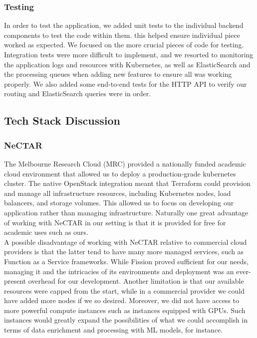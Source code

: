 \subsubsection{Testing}
In order to test the application, we added unit tests to the individual backend components to test the code within them. this helped ensure individual piece worked as expected. We focused on the more crucial pieces of code for testing. Integration tests were more difficult to implement, and we resorted to monitoring the application logs and resources with Kubernetes, as well as ElasticSearch and the processing queues when adding new features to ensure all was working properly. We also added some end-to-end tests for the HTTP API to verify our routing and ElasticSearch queries were in order.

\subsection{Tech Stack Discussion}

\subsubsection{NeCTAR}
The Melbourne Research Cloud (MRC) provided a nationally funded academic cloud environment that allowed us to deploy a production-grade kubernetes cluster. The native OpenStack integration meant that Terraform could provision and manage all infrastructure resources, including Kubernetes nodes, load balancers, and storage volumes. This allowed us to focus on developing our application rather than managing infrastructure. Naturally one great advantage of working with NeCTAR in our setting is that it is provided for free for academic uses such as ours. 
\\

A possible disadvantage of working with NeCTAR relative to commercial cloud providers is that the latter tend to have many more managed services, such as Function as a Service frameworks. While Fission proved sufficient for our needs, managing it and the intricacies of its environments and deployment was an ever-present overhead for our development. Another limitation is that our available resources were capped from the start, while in a commercial provider we could have added more nodes if we so desired. Moreover, we did not have access to more powerful compute instances such as instances equipped with GPUs. Such instances would greatly expand the possibilities of what we could accomplish in terms of data enrichment and processing with ML models, for instance.

